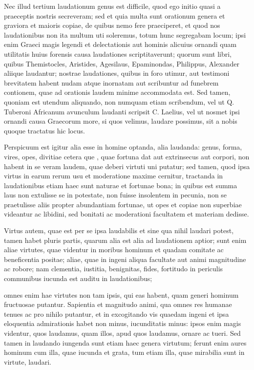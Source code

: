  Nec illud tertium laudationum genus est difficile, quod ego initio quasi a praeceptis nostris secreveram; sed et quia multa sunt orationum genera et graviora et maioris copiae, de quibus nemo fere praeciperet, et quod nos laudationibus non ita multum uti soleremus, totum hunc segregabam locum; ipsi enim Graeci magis legendi et delectationis aut hominis alicuius ornandi quam utilitatis huius forensis causa laudationes scriptitaverunt; quorum sunt libri, quibus Themistocles, Aristides, Agesilaus, Epaminondas, Philippus, Alexander aliique laudantur; nostrae laudationes, quibus in foro utimur, aut testimoni brevitatem habent nudam atque inornatam aut scribuntur ad funebrem contionem, quae ad orationis laudem minime accommodata est. Sed tamen, quoniam est utendum aliquando, non numquam etiam scribendum, vel ut Q. Tuberoni Africanum avunculum laudanti scripsit C. Laelius, vel ut nosmet ipsi ornandi causa Graecorum more, si quos velimus, laudare possimus, sit a nobis quoque tractatus hic locus.

 Perspicuum est igitur alia esse in homine optanda, alia laudanda: genus, forma, vires, opes, divitiae cetera que , quae fortuna dat aut extrinsecus aut corpori, non habent in se veram laudem, quae deberi virtuti uni putatur; sed tamen, quod ipsa virtus in earum rerum usu et moderatione maxime cernitur, tractanda in laudationibus etiam haec sunt naturae et fortunae bona; in quibus est summa laus non extulisse se in potestate, non fuisse insolentem in pecunia, non se praetulisse aliis propter abundantiam fortunae, ut opes et copiae non superbiae videantur ac libidini, sed bonitati ac moderationi facultatem et materiam dedisse.

 Virtus autem, quae est per se ipsa laudabilis et sine qua nihil laudari potest, tamen habet pluris partis, quarum alia est alia ad laudationem aptior; sunt enim aliae virtutes, quae videntur in moribus hominum et quadam comitate ac beneficentia positae; aliae, quae in ingeni aliqua facultate aut animi magnitudine ac robore; nam clementia, iustitia, benignitas, fides, fortitudo in periculis communibus iucunda est auditu in laudationibus;

 omnes enim hae virtutes non tam ipsis, qui eas habent, quam generi hominum fructuosae putantur. Sapientia et magnitudo animi, qua omnes res humanae tenues ac pro nihilo putantur, et in excogitando vis quaedam ingeni et ipsa eloquentia admirationis habet non minus, iucunditatis minus: ipsos enim magis videntur, quos laudamus, quam illos, apud quos laudamus, ornare ac tueri. Sed tamen in laudando iungenda sunt etiam haec genera virtutum; ferunt enim aures hominum cum illa, quae iucunda et grata, tum etiam illa, quae mirabilia sunt in virtute, laudari.

